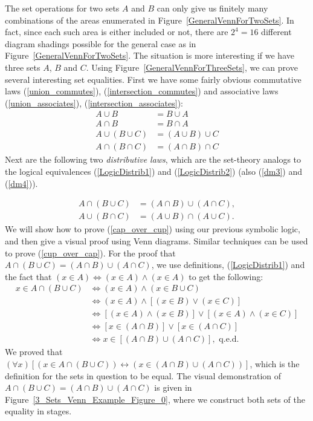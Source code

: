 The set operations for two sets $A$ and $B$ can only give us 
finitely many combinations of the areas enumerated in 
Figure~\ref{GeneralVennForTwoSets}.  In fact, since each
such area is either included or not, there are
$2^4=16$ different diagram shadings possible for 
the general case as in Figure~\ref{GeneralVennForTwoSets}.
The situation is more interesting if we have three 
sets $A$, $B$ and $C$.
Using Figure~\ref{GeneralVennForThreeSets}, we can 
prove several interesting set equalities.
First we have some fairly obvious commutative laws (\ref{union_commutes}),
(\ref{intersection_commutes}) and
associative laws (\ref{union_associates}), (\ref{intersection_associates}):
\begin{align}
A\cup B&=B\cup A \label{union_commutes}\\
A\cap B&=B\cap A\label{intersection_commutes}\\
A\cup(B\cup C)&=(A\cup B)\cup C\label{union_associates}\\
A\cap(B\cap C)&=(A\cap B)\cap C\label{intersection_associates}\end{align} 
Next are the following two {\it distributive laws},
which are the set-theory analogs to the logical equivalences
(\ref{LogicDistrib1}) and (\ref{LogicDistrib2}) (also
(\ref{dm3}) and (\ref{dm4})).

\begin{align}
A\cap(B\cup C)&=(A\cap B)\cup(A\cap C),\label{cap_over_cup}\\
A\cup(B\cap C)&=(A\cup B)\cap(A\cup C).\label{cup_over_cap}
\end{align}
\bex
We will show how to prove (\ref{cap_over_cup}) using our previous
symbolic logic, and then give a visual proof using Venn diagrams.
Similar techniques can be used to prove (\ref{cup_over_cap}).
For the proof that $A\cap(B\cup C)=(A\cap B)\cup(A\cap C)$, we
use definitions, (\ref{LogicDistrib1}) and the fact
that $(x\in A)\iff(x\in A)\wedge(x\in A)$ to get the following:
\begin{align*}
x\in A\cap(B\cup C)
   &\iff (x\in A)\wedge(x\in B\cup C)\\
   &\iff (x\in A)\wedge[(x\in B)\vee(x\in C)]\\
   &\iff [(x\in A)\wedge(x\in B)]\vee[(x\in A)\wedge(x\in C)]\\
   &\iff [x\in (A\cap B)]\vee[x\in (A\cap C)] \\
   &\iff x\in[(A\cap B)\cup(A\cap C)], \text{ q.e.d.}
\end{align*} 
We proved that  $(\forall x)[(x\in A\cap(B\cup C))\longleftrightarrow
                  (x\in(A\cap B)\cup(A\cap C))]$,
which is the definition for the sets in question to be equal.
The visual demonstration of  $A\cap(B\cup C)=(A\cap B)\cup(A\cap C)$
is given in Figure~\ref{3_Sets_Venn_Example_Figure_0}, where
we construct both sets of the equality in stages.

